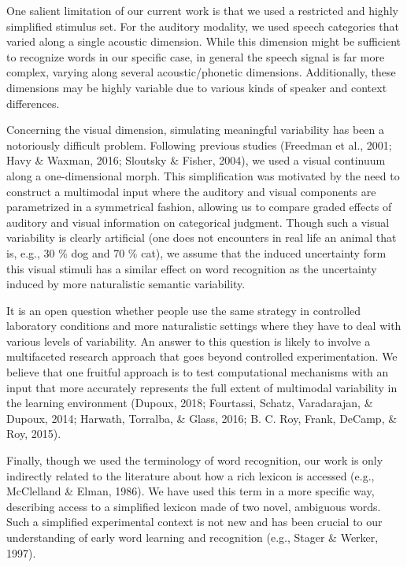 \documentclass[english,,man,floatsintext]{apa6}
\theoremstyle{definition}
\theoremstyle{definition}
\theoremstyle{definition}
\theoremstyle{remark}
\begin{document}
One salient limitation of our current work is that we used a restricted
and highly simplified stimulus set. For the auditory modality, we used
speech categories that varied along a single acoustic dimension. While
this dimension might be sufficient to recognize words in our specific
case, in general the speech signal is far more complex, varying along
several acoustic/phonetic dimensions. Additionally, these dimensions may
be highly variable due to various kinds of speaker and context
differences.

Concerning the visual dimension, simulating meaningful variability has
been a notoriously difficult problem. Following previous studies
(Freedman et al., 2001; Havy \& Waxman, 2016; Sloutsky \& Fisher, 2004),
we used a visual continuum along a one-dimensional morph. This
simplification was motivated by the need to construct a multimodal input
where the auditory and visual components are parametrized in a
symmetrical fashion, allowing us to compare graded effects of auditory
and visual information on categorical judgment. Though such a visual
variability is clearly artificial (one does not encounters in real life
an animal that is, e.g., 30 \% dog and 70 \% cat), we assume that the
induced uncertainty form this visual stimuli has a similar effect on
word recognition as the uncertainty induced by more naturalistic
semantic variability.

It is an open question whether people use the same strategy in
controlled laboratory conditions and more naturalistic settings where
they have to deal with various levels of variability. An answer to this
question is likely to involve a multifaceted research approach that goes
beyond controlled experimentation. We believe that one fruitful approach
is to test computational mechanisms with an input that more accurately
represents the full extent of multimodal variability in the learning
environment (Dupoux, 2018; Fourtassi, Schatz, Varadarajan, \& Dupoux,
2014; Harwath, Torralba, \& Glass, 2016; B. C. Roy, Frank, DeCamp, \&
Roy, 2015).

Finally, though we used the terminology of word recognition, our work is
only indirectly related to the literature about how a rich lexicon is
accessed (e.g., McClelland \& Elman, 1986). We have used this term in a
more specific way, describing access to a simplified lexicon made of two
novel, ambiguous words. Such a simplified experimental context is not
new and has been crucial to our understanding of early word learning and
recognition (e.g., Stager \& Werker, 1997).
\end{document}
